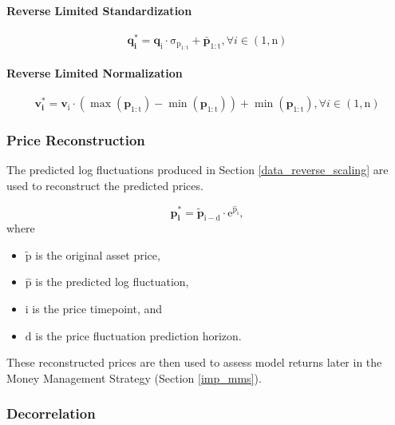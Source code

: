 \documentclass[a4paper,11pt,oneside]{article}
\theoremstyle{plain}
\theoremstyle{definition}
\begin{document}
	\paragraph{Reverse Limited Standardization}
	
	\begin{equation}
	\mathbf{q^{*}_i} = \mathrm{{\mathbf{q}_i} \cdot \sigma_{p_{1:t}} + \bar{\mathbf{p}}_{1:t}},  \forall  i \in (1, \mathrm{n})
	\end{equation}
	
	\paragraph{Reverse Limited Normalization}
	
	\begin{equation}
	\mathbf{v^{*}_i} = \mathrm{\mathbf{v}_i \cdot \left(\max \left( \mathbf{p}_{1:t} \right) - \min \left( \mathbf{p}_{1:t}\right) \right) 
		+ \min \left( \mathbf{p}_{1:t}  \right)      }   ,  \forall  i \in (1, \mathrm{n})
	\end{equation}
	
	
	\subsubsection{Price Reconstruction}\label{data_price_recon}
	
	The predicted log fluctuations produced in Section \ref{data_reverse_scaling} are used to reconstruct the predicted prices. 
	
	\begin{equation}\label{eq_price_recon}
	\mathbf{p^*_i} = \mathrm{\tilde{\mathbf{p}}_{i-d} \cdot e^{\hat{p}_{i}}} ,
	\end{equation}
	where
	\begin{itemize}
		\item [] $\mathrm{\tilde{p}}$ is the original asset price,
		\item [] $\mathrm{\hat{p}}$ is the predicted log fluctuation,
		\item [] $\mathrm{i}$ is the price timepoint, and 
		\item [] $\mathrm{d}$ is the price fluctuation prediction horizon.
		
	\end{itemize}
	\texttt{}\newline
	These reconstructed prices are then used to assess model returns later in the Money Management Strategy (Section \ref{imp_mms}).
	
	\subsubsection{Decorrelation}
	
\end{document}
